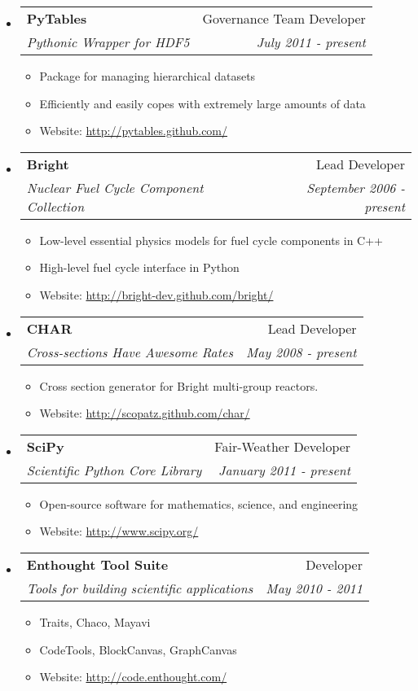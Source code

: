 \documentclass[letterpaper,11pt]{article}
\makeatletter
\newcommand{\resitem}[1]{\item #1 \vspace{-2pt}}
\newcommand{\ressubheading}[4]{
\begin{tabular*}{6.5in}{l@{\cftdotfill{\cftsecdotsep}\extracolsep{\fill}}r}
        \textbf{#1} & #2 \\
        \textit{#3} & \textit{#4} \\
\end{tabular*}\vspace{-6pt}}
\makeatother
\begin{document}
\begin{itemize}
\item
    \ressubheading{PyTables}{Governance Team Developer}{Pythonic Wrapper for HDF5}
                  {July 2011 - present}
    \begin{itemize}
        \resitem{Package for managing hierarchical datasets}
        \resitem{Efficiently and easily copes with extremely large amounts of data}
        \resitem{Website: \url{http://pytables.github.com/}}
    \end{itemize}

\item
    \ressubheading{Bright}{Lead Developer}{Nuclear Fuel Cycle Component Collection}
                  {September 2006 - present}
    \begin{itemize}
        \resitem{Low-level essential physics models for fuel cycle components in C++}
        \resitem{High-level fuel cycle interface in Python}
        \resitem{Website: \url{http://bright-dev.github.com/bright/}}
    \end{itemize}

\item
    \ressubheading{CHAR}{Lead Developer}{Cross-sections Have Awesome Rates}
                  {May 2008 - present}
    \begin{itemize}
        \resitem{Cross section generator for Bright multi-group reactors.}
        \resitem{Website: \url{http://scopatz.github.com/char/}}
    \end{itemize}

\item
    \ressubheading{SciPy}{Fair-Weather Developer}{Scientific Python Core Library}
                  {January 2011 - present}
    \begin{itemize}
        \resitem{Open-source software for mathematics, science, and engineering}
        \resitem{Website: \url{http://www.scipy.org/}}
    \end{itemize}

\item
    \ressubheading{Enthought Tool Suite}{Developer}
                  {Tools for building scientific applications}{May 2010 - 2011}
    \begin{itemize}
        \resitem{Traits, Chaco, Mayavi}
        \resitem{CodeTools, BlockCanvas, GraphCanvas}
        \resitem{Website: \url{http://code.enthought.com/}}
    \end{itemize}

\end{itemize}
\end{document}
